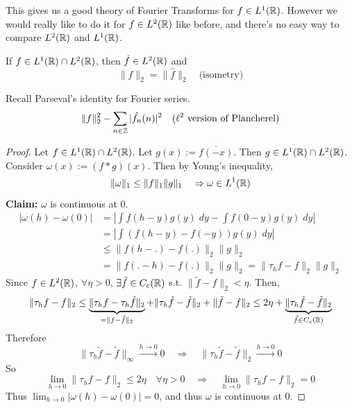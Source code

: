 This gives us a good theory of Fourier Transforms for $f \in L^1(\mathbb{R})$. However we would really like
to do it for $f \in L^2(\mathbb{R})$ like before, and there's no easy way to compare $L^2(\mathbb{R})$ and $L^1(\mathbb{R})$.

\begin{thm}
    If $f \in L^1(\mathbb{R}) \cap L^2(\mathbb{R})$, then $\hat{f} \in L^2(\mathbb{R})$ and
    \[
        \| f \|_2 = \| \hat{f} \|_2 \quad \text{(isometry)}
    \]   
\end{thm}
\begin{rem}
    Recall Parseval's identity for Fourier series. 
    \[
        \| f \|_2^2 - \sum_{n \in \mathbb{Z}} |\hat{f_n}(n)|^2 \quad (\ell^2 \text{ version of Plancherel})
    \] 
\end{rem}
\begin{proof}
    Let $f \in L^1(\mathbb{R}) \cap L^2(\mathbb{R})$. Let $g(x) := \overline{f(-x)}$. Then $g \in L^1(\mathbb{R}) \cap L^2(\mathbb{R})$.
    Consider $\omega(x) := (f*g)(x)$. Then by Young's inequality,
    \[
        \| \omega \|_1 \leq \| f \|_1 \| g \|_1 \quad \Rightarrow \omega \in L^1(\mathbb{R})
    \] 
    \textbf{Claim:} $\omega$ is continuous at $0$.
    \newline \noindent \begin{align*}
        |\omega(h) - \omega(0)| &= \left| \int f(h-y)g(y) \; dy - \int f(0 -y) g(y) \; dy \right| \\
        &= \left| \int (f(h-y) - f(-y))g(y) \; dy  \right| \\
        &\leq \| f(h - .) - f(.) \|_2 \| g \|_2 \\
        &= \| f(. - h) - f(.) \|_2 \| g \|_2 = \| \tau_h f - f \|_2 \| g \|_2        
    \end{align*}  
    Since $f \in L^2(\mathbb{R})$, $\forall \eta > 0$, $\exists \tilde{f} \in C_c(\mathbb{R})$ s.t. $\| \tilde{f} - f \|_2 < \eta$.
    Then,
    \[
        \| \tau_h f - f \|_2 \leq \underbrace{\| \tau_h f - \tau_h \tilde{f} \|_2}_{= \| f - \tilde{f} \|_2 } + \| \tau_h \tilde{f} - \tilde{f} \|_2 + \| \tilde{f} - f \|_2    
        \leq 2 \eta + \underbrace{\| \tau_h \tilde{f} - \tilde{f} \|_2}_{\tilde{f} \in C_c(\mathbb{R})}
    \]    
    Therefore
    \[
        \| \tau_h \tilde{f} - \tilde{f} \|_\infty \xrightarrow{h \to 0} 0 \quad \Rightarrow \quad \| \tau_h \tilde{f} - \tilde{f} \|_2 \xrightarrow{h \to 0} 0 
    \] 
    So 
    \[
        \lim_{h \to 0} \| \tau_h f  - f \|_2 \leq 2 \eta \quad \forall \eta > 0 \quad \Rightarrow \quad \lim_{h \to 0} \| \tau_h f - f \|_2 = 0 
    \]  
    Thus $\lim_{h \to 0} |\omega(h) - \omega(0)| = 0$, and thus $\omega$ is continuous at $0$.


\end{proof}
